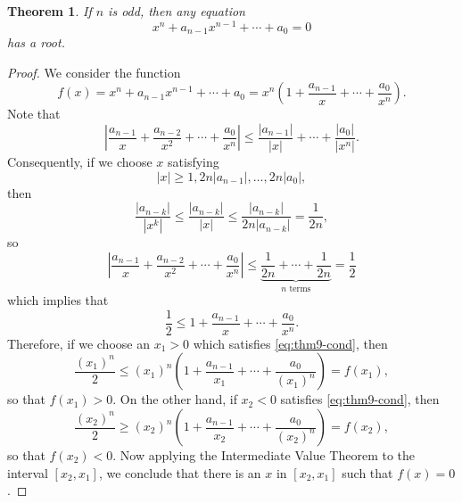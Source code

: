 \documentclass{article}
\numberwithin{corollary}{subsection}
\numberwithin{definition}{subsection}
\numberwithin{lemma}{subsection}
\newtheorem{theorem}{Theorem}
\numberwithin{theorem}{subsection}
\begin{document}
\begin{theorem}
  If $n$ is odd, then any equation \[
    x^n + a_{n-1}x^{n-1} + \cdots + a_0 = 0
  \] has a root.
\end{theorem}
\begin{proof}
  We consider the function \[
    f(x) = x^n + a_{n-1}x^{n-1} + \cdots + a_0
    = x^n \left(1 + \frac{a_{n-1}}{x} + \cdots + \frac{a_0}{x^n}\right).
  \] Note that \[
    \left|\frac{a_{n-1}}{x} + \frac{a_{n-2}}{x^2} + \cdots +
    \frac{a_0}{x^n}\right|
    \leq \frac{|a_{n-1}|}{|x|} + \cdots + \frac{|a_0|}{|x^n|}.
  \] Consequently, if we choose $x$ satisfying
  \begin{equation} \label{eq:thm9-cond} \tag{*}
    |x| \geq 1, 2n|a_{n-1}|, \ldots, 2n|a_0|,
  \end{equation}
  then \[
    \frac{|a_{n-k}|}{|x^k|}
    \leq \frac{|a_{n-k}|}{|x|}
    \leq \frac{|a_{n-k}|}{2n |a_{n-k}|}
    = \frac{1}{2n},
  \] so \[
    \left|\frac{a_{n-1}}{x} + \frac{a_{n-2}}{x^2} + \cdots +
    \frac{a_0}{x^n}\right|
    \leq \underbrace{\frac{1}{2n} + \cdots + \frac{1}{2n}}_\text{$n$ terms}
    = \frac{1}{2}
  \] which implies that \[
    \frac{1}{2} \leq 1 + \frac{a_{n-1}}{x} + \cdots + \frac{a_0}{x^n}.
  \] Therefore, if we choose an $x_1 > 0$ which satisfies \eqref{eq:thm9-cond},
  then \[
    \frac{(x_1)^n}{2}
    \leq (x_1)^n\left(1 + \frac{a_{n-1}}{x_1} + \cdots +
    \frac{a_0}{(x_1)^n}\right)
    = f(x_1),
  \] so that $f(x_1) > 0$. On the other hand, if $x_2 < 0$ satisfies
  \eqref{eq:thm9-cond}, then \[
    \frac{(x_2)^n}{2}
    \geq (x_2)^n\left(1 + \frac{a_{n-1}}{x_2} + \cdots +
    \frac{a_0}{(x_2)^n}\right)
    = f(x_2),
  \] so that $f(x_2) < 0$. Now applying the Intermediate Value Theorem to the
  interval $[x_2, x_1]$, we conclude that there is an $x$ in $[x_2, x_1]$ such
  that $f(x) = 0$.
\end{proof}
\end{document}
